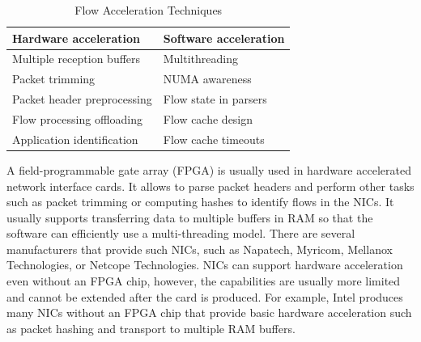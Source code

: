 \begin{table}[ht!]
    \centering
    \begin{tabular}{|l|l|}
    \hline
    \textbf{Hardware acceleration} & \textbf{Software acceleration} \\ \hline
    Multiple reception buffers & Multithreading \\
    Packet trimming & NUMA awareness \\
    Packet header preprocessing & Flow state in parsers \\
    Flow processing offloading & Flow cache design \\
    Application identification & Flow cache timeouts \\ \hline
    \end{tabular}
    \caption{Flow Acceleration Techniques}
    \label{tab:flow-acc-techniques}
\end{table}


A field-programmable gate array (FPGA) is usually used in hardware accelerated network interface cards. It allows to parse packet headers and perform other tasks such as packet trimming or computing hashes to identify flows in the NICs. It usually supports transferring data to multiple buffers in RAM so that the software can efficiently use a multi-threading model. There are several manufacturers that provide such NICs, such as Napatech, Myricom, Mellanox Technologies, or Netcope Technologies. NICs can support hardware acceleration even without an FPGA chip, however, the capabilities are usually more limited and cannot be extended after the card is produced. For example, Intel produces many NICs without an FPGA chip that provide basic hardware acceleration such as packet hashing and transport to multiple RAM buffers.

